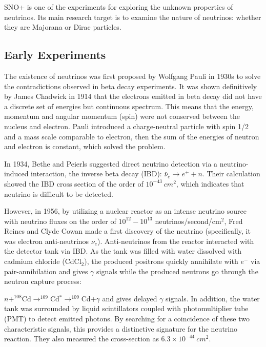 \documentclass[preprint,12pt]{elsarticle}
\begin{document}
SNO+ is one of the experiments for exploring the unknown properties of neutrinos. Its main research target is to examine the nature of neutrinos: whether they are Majorana or Dirac particles.

\subsection{Early Experiments}
The existence of neutrinos was first proposed by Wolfgang Pauli in 1930s to solve the contradictions observed in beta decay experiments. It was shown definitively by James Chadwick in 1914 that the electrons emitted in beta decay did not have a discrete set of energies but continuous spectrum\cite{cowanexpintro}. This means that the energy, momentum and angular momentum (spin) were not conserved between the nucleus and electron. Pauli introduced a charge-neutral particle with spin 1/2 and a mass scale comparable to electron, then the sum of the energies of neutron and electron is constant, which solved the problem. 

In 1934, Bethe and Peierls suggested direct neutrino detection via a neutrino-induced interaction, the inverse beta decay (IBD): $\bar{\nu}_e\to e^+ + n$. Their calculation showed the IBD cross section of the order of $10^{-43}~cm^2$, which indicates that neutrino is difficult to be detected\cite{bethe1}.
 
However, in 1956, by utilizing a nuclear reactor as an intense neutrino source with neutrino fluxes on the order of $10^{12}-10^{13}$ neutrinos/second/cm$^2$, Fred Reines and Clyde Cowan made a first discovery of the neutrino (specifically, it was electron anti-neutrinos $\nu_e$). Anti-neutrinos from the reactor interacted with the detector tank via IBD. As the tank was filled with water dissolved with cadmium chloride (CdCl$_2$), the produced positrons quickly annihilate with $e^-$ via pair-annihilation and gives $\gamma$ signals while the produced neutrons go through the neutron capture process: 

\noindent$n+^{108}$Cd$\to ^{109}$Cd$^*\to ^{109}$Cd$ +\gamma$ and gives delayed $\gamma$ signals. In addition, the water tank was surrounded by liquid scintillators coupled with photomultiplier tube (PMT) to detect emitted photons. By searching for a coincidence of these two characteristic signals, this provides a distinctive signature for the neutrino reaction. They also measured the cross-section as $6.3\times10^{-44}~cm^2$.
\end{document}
